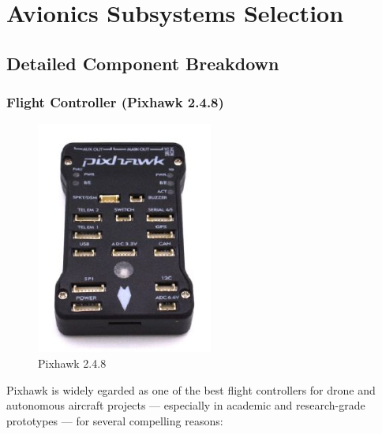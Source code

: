 \documentclass[12pt]{report}
\begin{document}
\newpage
    \section{Avionics Subsystems Selection}
      \subsection{Detailed Component Breakdown}
        \subsubsection{\large Flight Controller (Pixhawk 2.4.8)}
        \begin{figure}
          \includegraphics[width=1\linewidth]{pixhawk.png}
          \caption{Pixhawk 2.4.8}
          \label{fig:pixhawk}
        \end{figure}
        Pixhawk is widely egarded as one of the best flight controllers for drone and autonomous aircraft projects — especially in academic and research-grade prototypes — for several compelling reasons:
\end{document}

